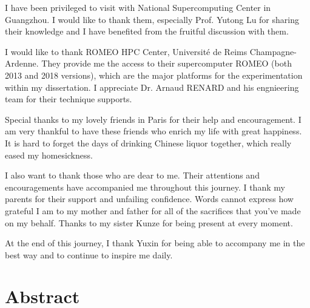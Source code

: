 \documentclass{xinzhewu}
\begin{document}
I have been privileged to visit with National Supercomputing Center in Guangzhou. I would like to thank them, especially Prof. Yutong Lu for sharing their knowledge and I have benefited from the fruitful discussion with them.

I would like to thank ROMEO HPC Center, Universit\'e de Reims Champagne-Ardenne. They provide me the access to their supercomputer ROMEO (both 2013 and 2018 versions), which are the major platforms for the experimentation within my dissertation. I appreciate Dr. Arnaud RENARD and his engnieering team for their technique supports.

Special thanks to my lovely friends in Paris for their help and encouragement. I am very thankful to have these friends who enrich my life with great happiness. It is hard to forget the days of drinking Chinese liquor together, which really eased my homesickness.

I also want to thank those who are dear to me. Their attentions and encouragements have accompanied me throughout this journey. I thank my parents for their support and unfailing confidence. Words cannot express how grateful I am to my mother and father for all of the sacrifices that you’ve made on my behalf. Thanks to my sister Kunze for being present at every moment.
	
At the end of this journey, I thank Yuxin for being able to accompany me in the best way and to continue to inspire me daily.


\clearemptydoublepage

\chapter*{Abstract}
\thispagestyle{empty}


\iffalse
An important application of supercomputers is to solve large-scale linear systems and eigenvalue problems by iterative methods. As the number of cores and heterogeneity of supercomputers increases, time spent in communication will be important comparing with the computation time, hence applications can be seen as a combination of distributed and parallel computing. Effectively solving these problems by iterative methods on large-scale platforms requires multi-levels of parallelism, and can minimize global communication, reduce synchronization, and facilitate asynchronous communication. In this thesis, we develop a distributed and parallel multi-level programming paradigm for iterative methods on High-Performance Computing (HPC) clusters. An implementation of a manager engine and runtime can handle the traffic, fault tolerance, and reusability of this paradigm on homogeneous and heterogeneous clusters. Finally, an example of iterative methods is developed based on this paradigm to simultaneously solve linear systems with multiple Right-hand sides (RHSs). Experiments on supercomputers have demonstrated that the implementation achieves better numerical and parallel performance than conventional methods.
\fi
\end{document}
